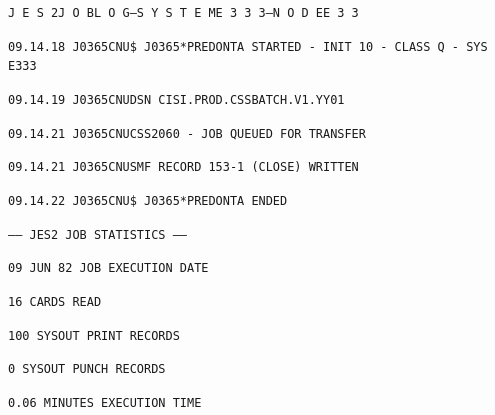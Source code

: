 \texttt{J E S 2\quad J O B\quad L O G\quad --\quad S Y S T E M\quad E 3 3 3\quad --\quad N O D E\quad E 3 3}

\texttt{09.14.18 J0365CNU\quad \$ J0365*PREDONTA STARTED - INIT 10 - CLASS Q - SYS E333}

\texttt{09.14.19 J0365CNU\quad DSN CISI.PROD.CSSBATCH.V1.YY01}

\texttt{09.14.21 J0365CNU\quad CSS2060 - JOB QUEUED FOR TRANSFER}

\texttt{09.14.21 J0365CNU\quad SMF RECORD 153-1 (CLOSE) WRITTEN}

\texttt{09.14.22 J0365CNU\quad \$ J0365*PREDONTA ENDED}

\texttt{------ JES2 JOB STATISTICS ------}

\texttt{09 JUN 82 JOB EXECUTION DATE}

\texttt{16 CARDS READ}

\texttt{100 SYSOUT PRINT RECORDS}

\texttt{0 SYSOUT PUNCH RECORDS}

\texttt{0.06 MINUTES EXECUTION TIME}


